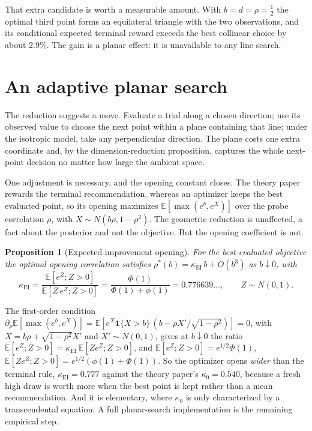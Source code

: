 \documentclass[11pt]{article}
\theoremstyle{itheads}
\newtheorem{proposition}{Proposition}
\newcommand{\E}{\mathbb{E}}
\begin{document}
That extra candidate is worth a measurable amount. With
$b=d=\rho=\tfrac12$ the optimal third point forms an equilateral triangle
with the two observations, and its conditional expected terminal reward
exceeds the best collinear choice by about $2.9\%$. The gain is a planar
effect: it is unavailable to any line search.

\section{An adaptive planar search}

The reduction suggests a move. Evaluate a trial along a chosen direction;
use its observed value to choose the next point within a plane containing
that line; under the isotropic model, take any perpendicular direction.
The plane costs one extra coordinate and, by the dimension-reduction
proposition, captures the whole next-point decision no matter how large
the ambient space.

One adjustment is necessary, and the opening constant closes. The
theory paper rewards the terminal recommendation, whereas an optimizer
keeps the best evaluated point, so its opening maximizes
$\E[\max(e^{b},e^{X})]$ over the probe correlation $\rho$, with
$X\sim N(b\rho,1-\rho^{2})$. The geometric reduction is unaffected, a fact about the
posterior and not the objective. But the opening coefficient is not.

\begin{proposition}[Expected-improvement opening]
For the best-evaluated objective the optimal opening correlation
satisfies $\rho^{*}(b)=\kappa_{\mathrm{EI}}\,b+O(b^{3})$ as $b\downarrow0$,
with
\begin{equation}
\kappa_{\mathrm{EI}}=\frac{\E[e^{Z};Z>0]}{\E[Z\,e^{Z};Z>0]}
=\frac{\Phi(1)}{\Phi(1)+\phi(1)}=0.776639\ldots,
\qquad Z\sim N(0,1).
\end{equation}
\end{proposition}

\noindent The first-order condition
$\partial_\rho\E[\max(e^{b},e^{X})]
=\E\!\left[e^{X}\mathbf{1}\{X>b\}\,(b-\rho X'/\sqrt{1-\rho^{2}})\right]=0$,
with $X=b\rho+\sqrt{1-\rho^{2}}X'$ and $X'\sim N(0,1)$, gives at
$b\downarrow0$ the ratio
$\E[e^{Z};Z>0]=\kappa_{\mathrm{EI}}\,\E[Z e^{Z};Z>0]$, and
$\E[e^{Z};Z>0]=e^{1/2}\Phi(1)$, $\E[Z e^{Z};Z>0]=e^{1/2}(\phi(1)+\Phi(1))$.
So the optimizer opens \emph{wider} than the terminal rule,
$\kappa_{\mathrm{EI}}=0.777$ against the theory paper's
$\kappa_0=0.540$, because a fresh high draw is worth more when the
best point is kept rather than a mean recommendation. And it is
elementary, where $\kappa_0$ is only characterized by a transcendental
equation. A full planar-search implementation is the remaining
empirical step.
\end{document}
